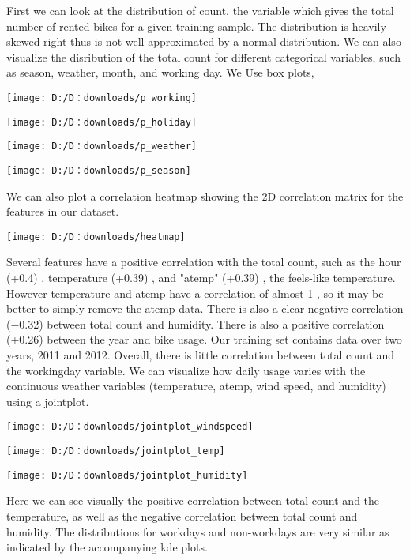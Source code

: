\blindtext
First we can look at the distribution of count, 
the variable which gives the total number of rented bikes for a given training sample. 
The distribution is heavily skewed right  thus is not well approximated by a normal distribution.
\blindtext
\blindtext
We can also visualize the disribution of the total count for different categorical variables, 
such as season, weather, month, and working day. 
We Use box plots, 
\blindtext
\begin{center}
	\texttt{[image: D:/D：downloads/p\_working]}
\end{center}
\blindtext
\begin{center}
	\texttt{[image: D:/D：downloads/p\_holiday]}
\end{center}
\blindtext
\begin{center}
	\texttt{[image: D:/D：downloads/p\_weather]}
\end{center}
\blindtext
\begin{center}
	\texttt{[image: D:/D：downloads/p\_season]}
\end{center}
\blindtext

\blindtext
\blindtext
We can also plot a correlation heatmap showing the 2D correlation matrix for the features in our dataset. 
\blindtext
\begin{center}
	\texttt{[image: D:/D：downloads/heatmap]}
\end{center}
\blindtext
Several features have a positive correlation with the total count, such as the hour  (+0.4) , temperature  (+0.39) , and "atemp"  (+0.39) , the feels-like temperature. However temperature and atemp have a correlation of almost  1 , so it may be better to simply remove the atemp data. There is also a clear negative correlation  (−0.32)  between total count and humidity.
\blindtext
There is also a positive correlation  (+0.26)  between the year and bike usage. Our training set contains data over two years, 2011 and 2012.
\blindtext
Overall, there is little correlation between total count and the workingday variable. 
\blindtext
We can visualize how daily usage varies with the continuous weather variables (temperature, atemp, wind speed, and humidity) using a jointplot. 
\begin{center}
	\texttt{[image: D:/D：downloads/jointplot\_windspeed]}
\end{center}
\blindtext
\begin{center}
	\texttt{[image: D:/D：downloads/jointplot\_temp]}
\end{center}
\blindtext
\begin{center}
	\texttt{[image: D:/D：downloads/jointplot\_humidity]}
\end{center}
\blindtext
\blindtext
Here we can see visually the positive correlation between total count and the temperature, as well as the negative correlation between total count and humidity. 
The distributions for workdays and non-workdays are very similar as indicated by the accompanying kde plots.





